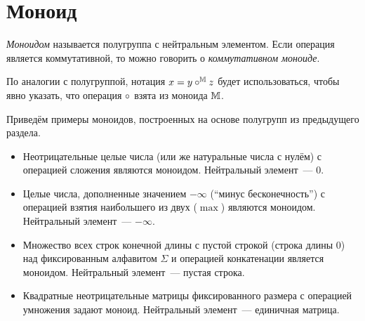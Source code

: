 \section{Моноид}
\label{sec:Monoid}

\begin{definition}[Моноид]
    \emph{Моноидом} называется полугруппа с нейтральным элементом.
    Если операция является коммутативной, то можно говорить о \emph{коммутативном моноиде}.
\end{definition}

По аналогии с полугруппой, нотация $x = y \circ^{\mathbb{\mathbb{M}}} z$ будет использоваться, чтобы явно указать, что операция $\circ$ взята из моноида $\mathbb{M}$.

\begin{example}
    Приведём примеры моноидов, построенных на основе полугрупп из предыдущего раздела.
    \begin{itemize}
        \item Неотрицательные целые числа (или же натуральные числа с нулём) с операцией сложения являются моноидом.
              Нейтральный элемент~--- $0$.
        \item Целые числа, дополненные значением $-\infty$ (\enquote{минус бесконечность}) с операцией взятия наибольшего из двух ($\max$) являются моноидом.
              Нейтральный элемент~--- $-\infty$.
        \item Множество всех строк конечной длины с пустой строкой (строка длины 0) над фиксированным алфавитом $\Sigma$ и операцией конкатенации является моноидом.
              Нейтральный элемент~--- пустая строка.
        \item Квадратные неотрицательные матрицы%
               фиксированного размера с операцией умножения задают моноид.
              Нейтральный элемент~--- единичная матрица.
    \end{itemize}
\end{example}
